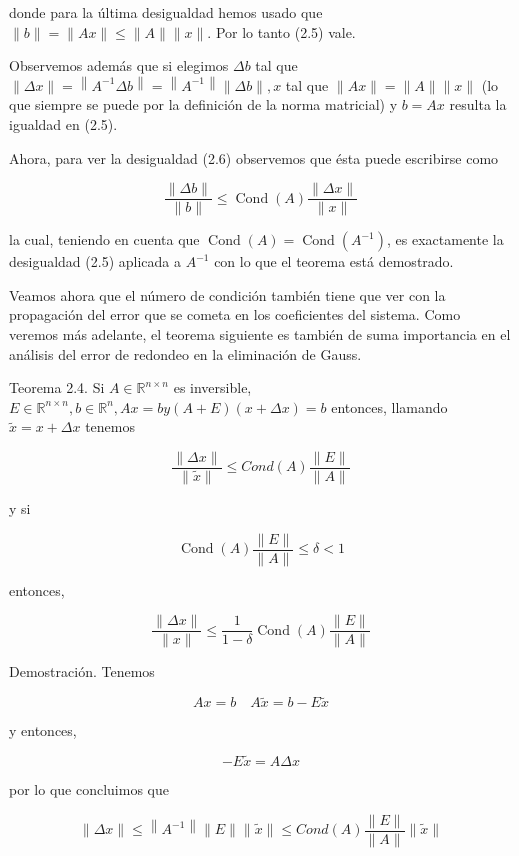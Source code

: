 \documentclass[10pt]{article}
\begin{document}
donde para la última desigualdad hemos usado que $\|b\|=\|A x\| \leq\|A\|\|x\|$. Por lo tanto (2.5) vale.

Observemos además que si elegimos $\Delta b$ tal que $\|\Delta x\|=\left\|A^{-1} \Delta b\right\|=\left\|A^{-1}\right\|\|\Delta b\|, x$ tal que $\|A x\|=\|A\|\|x\|$ (lo que siempre se puede por la definición de la norma matricial) y $b=A x$ resulta la igualdad en (2.5).

Ahora, para ver la desigualdad (2.6) observemos que ésta puede escribirse como

$$
\frac{\|\Delta b\|}{\|b\|} \leq \operatorname{Cond}(A) \frac{\|\Delta x\|}{\|x\|}
$$

la cual, teniendo en cuenta que $\operatorname{Cond}(A)=\operatorname{Cond}\left(A^{-1}\right)$, es exactamente la desigualdad (2.5) aplicada a $A^{-1}$ con lo que el teorema está demostrado.

Veamos ahora que el número de condición también tiene que ver con la propagación del error que se cometa en los coeficientes del sistema. Como veremos más adelante, el teorema siguiente es también de suma importancia en el análisis del error de redondeo en la eliminación de Gauss.

Teorema 2.4. Si $A \in \mathbb{R}^{n \times n}$ es inversible, $E \in \mathbb{R}^{n \times n}, b \in \mathbb{R}^{n}, A x=b y(A+E)(x+\Delta x)=b$ entonces, llamando $\tilde{x}=x+\Delta x$ tenemos


\begin{equation*}
\frac{\|\Delta x\|}{\|\tilde{x}\|} \leq C o n d(A) \frac{\|E\|}{\|A\|} \tag{2.7}
\end{equation*}


y si

$$
\operatorname{Cond}(A) \frac{\|E\|}{\|A\|} \leq \delta<1
$$

entonces,


\begin{equation*}
\frac{\|\Delta x\|}{\|x\|} \leq \frac{1}{1-\delta} \operatorname{Cond}(A) \frac{\|E\|}{\|A\|} \tag{2.8}
\end{equation*}


Demostración. Tenemos

$$
A x=b \quad A \tilde{x}=b-E \tilde{x}
$$

y entonces,

$$
-E \tilde{x}=A \Delta x
$$

por lo que concluimos que

$$
\|\Delta x\| \leq\left\|A^{-1}\right\|\|E\|\|\tilde{x}\| \leq C o n d(A) \frac{\|E\|}{\|A\|}\|\tilde{x}\|
$$
\end{document}
